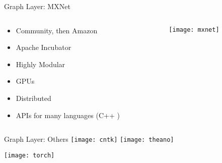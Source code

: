 \begin{slide}{Graph Layer: MXNet}
  \begin{columns}
    \begin{column}{0.5\textwidth}
      \begin{itemize}
        \item Community, then Amazon
        \item Apache Incubator
        \item Highly Modular
        \item GPUs \cmark
        \item Distributed \cmark
        \item APIs for many languages (C++ \cmark)
      \end{itemize}
    \end{column}
    \begin{column}{0.5\textwidth}
      \texttt{[image: mxnet]}
    \end{column}
  \end{columns}
\end{slide}

\begin{slide}{Graph Layer: Others}
  \texttt{[image: cntk]}
  \hspace{1cm}
  \texttt{[image: theano]}


  \vspace{1.5cm}
  \texttt{[image: torch]}
\end{slide}
